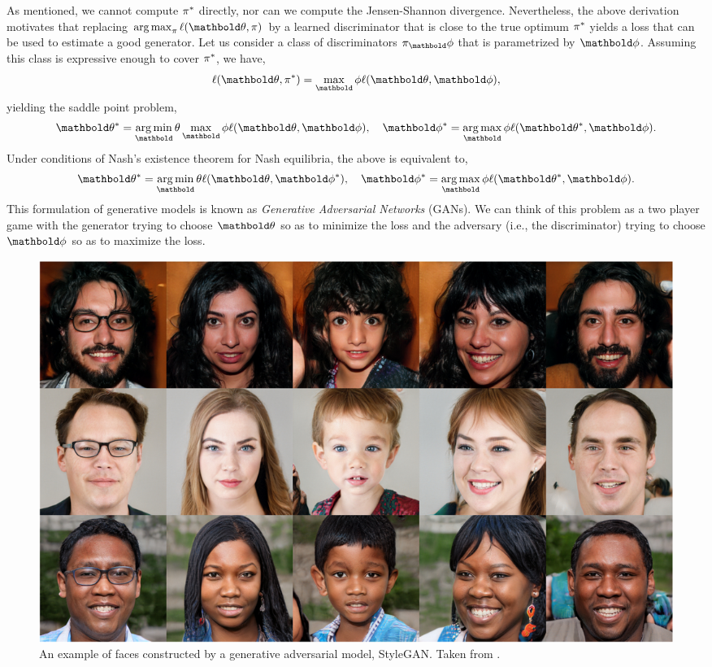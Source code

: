 \documentclass{tufte-handout}
\begin{document}
As mentioned, we cannot compute $\pi^*$ directly, nor can we compute the Jensen-Shannon divergence. Nevertheless, the above derivation motivates that replacing $\argmax_\pi \ell(\vtheta, \pi)$ by a learned discriminator that is close to the true optimum $\pi^*$ yields a loss that can be used to estimate a good generator. Let us consider a class of discriminators $\pi_\vphi$ that is parametrized by $\vphi$. Assuming this class is expressive enough to cover $\pi^*$, we have, \begin{align}
    \ell(\vtheta, \s{\pi}) = \max_\vphi \ell(\vtheta, \vphi),
\end{align} yielding the saddle point problem, \begin{align}
    \s{\vtheta} = \argmin_\vtheta \max_\vphi \ell(\vtheta, \vphi), \quad \s{\vphi} = \argmax_\vphi \ell(\s{\vtheta}, \vphi).
\end{align} Under conditions of Nash's existence theorem for Nash equilibria, the above is equivalent to, \begin{align}
    \s{\vtheta} = \argmin_\vtheta \ell(\vtheta, \s{\vphi}), \quad \s{\vphi} = \argmax_\vphi \ell(\s{\vtheta}, \vphi).
\end{align} This formulation of generative models is known as \emph{Generative Adversarial Networks} (GANs). We can think of this problem as a two player game with the generator trying to choose $\vtheta$ so as to minimize the loss and the adversary (i.e., the discriminator) trying to choose $\vphi$ so as to maximize the loss.

\begin{figure}
    \includegraphics[width=\textwidth]{figures/faces_gans.png}
    \caption{An example of faces constructed by a generative adversarial model, StyleGAN. Taken from \citep{karras2019style}.}
\end{figure}

\nocite{*}

\end{document}
